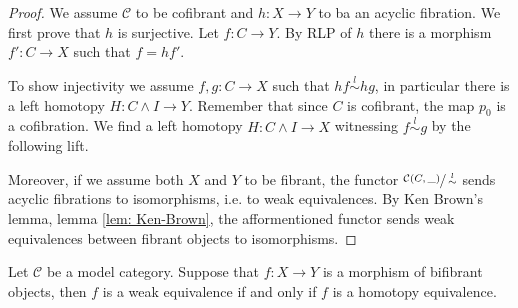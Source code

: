 \documentclass[../thesis.tex]{subfiles}
\begin{document}
            \begin{proof}
                We assume $\mathcal{C}$ to be cofibrant and $h:X\rightarrow Y$ to ba an acyclic fibration. We first prove that $h$ is surjective. Let $f:C\rightarrow Y$. By RLP of $h$ there is a morphism $f':C\rightarrow X$ such that $f = hf'$.
                \begin{center}
                \end{center}
                
                To show injectivity we assume $f,g:C\rightarrow X$ such that $hf\overset{l}{\sim} hg$, in particular there is a left homotopy $H:C\wedge I \rightarrow Y$. Remember that since $C$ is cofibrant, the map $p_0$ is a cofibration. We find a left homotopy $H:C\wedge I \rightarrow X$ witnessing $f\overset{l}{\sim} g$ by the following lift.
                \begin{center}
                \end{center}

                Moreover, if we assume both $X$ and $Y$ to be fibrant, the functor $\sfrac{\mathcal{C}(C,\_)}{\overset{l}{\sim}}$ sends acyclic fibrations to isomorphisms, i.e. to weak equivalences. By Ken Brown's lemma, lemma \ref{lem: Ken-Brown}, the afformentioned functor sends weak equivalences between fibrant objects to isomorphisms.
            \end{proof}

            \begin{thm}\label{thm: Whitehead}
                Let $\mathcal{C}$ be a model category. Suppose that $f : X \rightarrow Y$ is a morphism of bifibrant objects, then $f$ is a weak equivalence if and only if $f$ is a homotopy equivalence.
            \end{thm}
\end{document}
